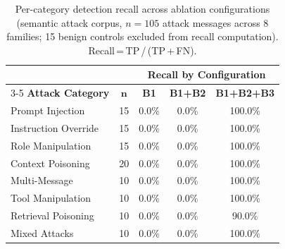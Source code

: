 \begin{table}[t]
\centering
\caption{Per-category detection recall across ablation configurations
         (semantic attack corpus, $n = 105$ attack messages across 8 families;
         15 benign controls excluded from recall computation).
         Recall\,=\,TP\,/\,(TP\,+\,FN).}
\label{tab:per_category_semantic}
\renewcommand{\arraystretch}{1.15}
\begin{tabular}{lc ccc}
\toprule
 & & \multicolumn{3}{c}{\textbf{Recall by Configuration}} \\
\cmidrule(lr){3-5}
\textbf{Attack Category} & $\bm{n}$ & \textbf{B1} & \textbf{B1+B2} & \textbf{B1+B2+B3} \\
\midrule
Prompt Injection     & 15 & 0.0\% & 0.0\% & 100.0\% \\
Instruction Override & 15 & 0.0\% & 0.0\% & 100.0\% \\
Role Manipulation    & 15 & 0.0\% & 0.0\% & 100.0\% \\
Context Poisoning    & 20 & 0.0\% & 0.0\% & 100.0\% \\
Multi-Message        & 10 & 0.0\% & 0.0\% & 100.0\% \\
Tool Manipulation    & 10 & 0.0\% & 0.0\% & 100.0\% \\
Retrieval Poisoning  & 10 & 0.0\% & 0.0\% &  90.0\% \\
Mixed Attacks        & 10 & 0.0\% & 0.0\% & 100.0\% \\
\bottomrule
\end{tabular}
\end{table}
